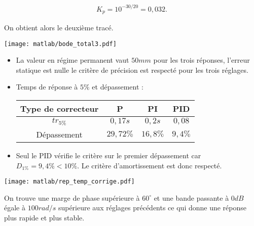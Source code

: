\begin{align*}
\boxed{
K_p=10^{-30/20}=0,032.
}
\end{align*}

On obtient alors le deuxième tracé.

\begin{center}
\texttt{[image: matlab/bode\_total3.pdf]}
\end{center} 


\question{}%

\begin{itemize}
\item La valeur en régime permanent vaut $50mm$ pour les trois réponses, l'erreur statique est nulle le critère de précision
est respecté pour les trois réglages.

\item Temps de réponse à $5\%$ et dépassement : 

\begin{tabular}{|c|c|c|c|}
\hline 
Type de correcteur & \textbf{P} & \textbf{PI} & \textbf{PID} \\ 
\hline 
$tr_{5\%}$ & $0,17s$ & $0,2s$ & $0,08$ \\ 
\hline 
Dépassement & $29,72\%$ & $16,8\%$ & $9,4\%$ \\ 
\hline 
\end{tabular} 

\item Seul le PID vérifie le critère sur le premier dépassement car $D_{1\%}=9,4\%<10\%$. Le critère d'amortissement est
donc respecté.
\end{itemize}

\begin{center}
\texttt{[image: matlab/rep\_temp\_corrige.pdf]}
\end{center}

\question{}%

On trouve une marge de phase supérieure à $60^{\circ}$ et une bande passante à $0dB$ égale à $100rad/s$ supérieure aux réglages précédents ce qui donne une réponse plus rapide et plus stable.



\else
\fi
